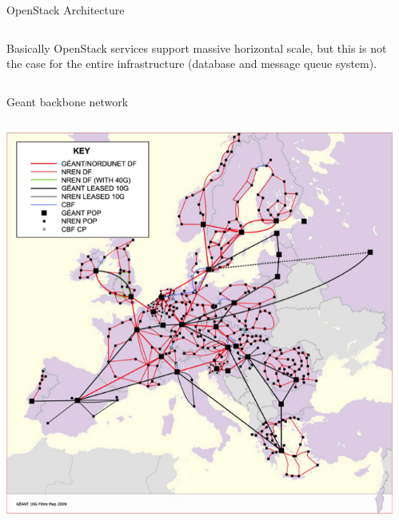 \documentclass[final,t]{beamer}
\begin{document}
\begin{frame}[fragile]{}
\begin{columns}[t]
\begin{column}{.49\linewidth}
\begin{block}{\Large OpenStack Architecture}
\begin{columns}[T]
\begin{column}{0.95\linewidth}
        {\Large Basically OpenStack services support massive horizontal scale, but this is not the case for the entire infrastructure (database and message queue system).}
	\end{column}
        \end{columns}
      \end{block}

      \begin{block}{\Large Geant backbone network}
        \begin{columns}[T]
          \begin{column}{0.95\linewidth}
           \centering
           \includegraphics[width=0.95\linewidth]{images/geant.png}
          \end{column}
        \end{columns}
      \end{block}

   \end{column}


    \begin{column}{.49\linewidth}


\end{column}
\end{columns}
\end{frame}
\end{document}
